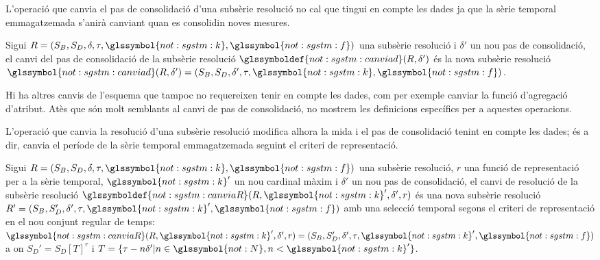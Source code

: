 L'operació que canvia el pas de consolidació d'una subsèrie resolució
no cal que tingui en compte les dades ja que la sèrie temporal
emmagatzemada s'anirà canviant quan es consolidin noves mesures.
\begin{definition}
  \label{def:sgstm:canviad}
  Sigui $R = (S_B,S_D,\delta,\tau,\glssymbol{not:sgstm:k},\glssymbol{not:sgstm:f})$ una subsèrie resolució i
  $\delta'$ un nou pas de consolidació, el canvi del pas de
  consolidació de la subsèrie resolució
  $\glssymboldef{not:sgstm:canviad}(R,\delta')$ és la nova subsèrie resolució
  $\glssymbol{not:sgstm:canviad}(R,\delta')=(S_B,S_D,\delta',\tau,\glssymbol{not:sgstm:k},\glssymbol{not:sgstm:f})$.
\end{definition}

Hi ha altres canvis de l'esquema que tampoc no requereixen tenir en
compte les dades, com per exemple canviar la funció d'agregació
d'atribut. Atès que són molt semblants al canvi de pas de
consolidació, no mostrem les definicions específics per a aquestes
operacions.


L'operació que canvia la resolució d'una subsèrie resolució modifica
alhora la mida i el pas de consolidació tenint en compte les dades; és
a dir, canvia el període de la sèrie temporal emmagatzemada seguint el
criteri de representació.
\begin{definition}
  Sigui $R = (S_B,S_D,\delta,\tau,\glssymbol{not:sgstm:k},\glssymbol{not:sgstm:f})$ una subsèrie resolució, $r$
  una funció de representació per a la sèrie temporal, $\glssymbol{not:sgstm:k}'$ un nou
  cardinal màxim i $\delta'$ un nou pas de consolidació, el canvi de
  resolució de la subsèrie resolució
  $\glssymboldef{not:sgstm:canviaR}(R,\glssymbol{not:sgstm:k}',\delta',r)$ és una nova subsèrie
  resolució $R' = (S_B,S_D',\delta',\tau,\glssymbol{not:sgstm:k}',\glssymbol{not:sgstm:f})$ amb una selecció
  temporal segons el criteri de representació en el nou conjunt
  regular de temps:
  $\glssymbol{not:sgstm:canviaR}(R,\glssymbol{not:sgstm:k}',\delta',r)=(S_B,S_D',\delta',\tau,\glssymbol{not:sgstm:k}',\glssymbol{not:sgstm:f})$
  a on $S_D' = S_D[T]^r$ i $T=\{ \tau-n\delta' | n\in\glssymbol{not:N},n<\glssymbol{not:sgstm:k}'
  \}$.
\end{definition}


